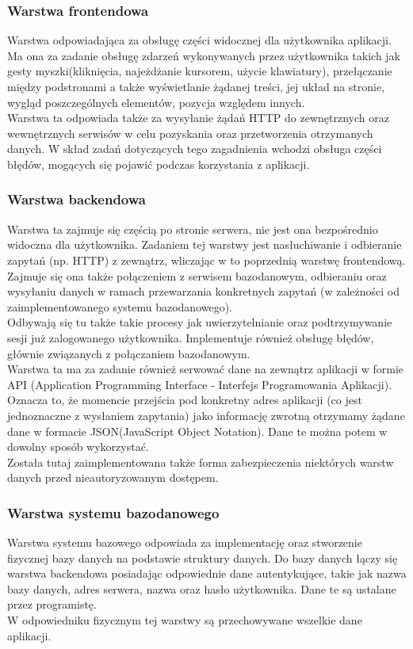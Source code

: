 \documentclass[eng,printmode]{mgr}
\begin{document}
\subsubsection{Warstwa frontendowa}
Warstwa odpowiadająca za obsługę części widocznej dla użytkownika aplikacji. Ma ona za zadanie obsługę zdarzeń wykonywanych przez użytkownika takich jak gesty myszki(kliknięcia, najeżdżanie kursorem, użycie klawiatury), przełączanie między podstronami a także wyświetlanie żądanej treści, jej układ na stronie, wygląd poszczególnych elementów, pozycja względem innych.
\\
Warstwa ta odpowiada także za wysyłanie żądań HTTP do zewnętrznych oraz wewnętrznych serwisów w celu pozyskania oraz przetworzenia otrzymanych danych. W skład zadań dotyczących tego zagadnienia wchodzi obsługa części błędów, mogących się pojawić podczas korzystania z aplikacji.
\subsubsection{Warstwa backendowa}
Warstwa ta zajmuje się częścią po stronie serwera, nie jest ona bezpośrednio widoczna dla użytkownika. Zadaniem tej warstwy jest nasłuchiwanie i odbieranie zapytań (np. HTTP) z zewnątrz, wliczając w to poprzednią warstwę frontendową. Zajmuje się ona także połączeniem z serwisem bazodanowym, odbieraniu oraz wysyłaniu danych w ramach przewarzania konkretnych zapytań (w zależności od zaimplementowanego systemu bazodanowego).
\\
Odbywają się tu także takie procesy jak uwierzytelnianie oraz podtrzymywanie sesji już zalogowanego użytkownika. Implementuje również obsługę błędów, głównie związanych z połączaniem bazodanowym.
\\
Warstwa ta ma za zadanie również serwować dane na zewnątrz aplikacji w formie API (Application Programming Interface - Interfejs Programowania Aplikacji)\cite{API}. Oznacza to, że momencie przejścia pod konkretny adres aplikacji (co jest jednoznaczne z wysłaniem zapytania) jako informację zwrotną otrzymamy żądane dane w formacie JSON(JavaScript Object Notation)\cite{JSON}. Dane te można potem w dowolny sposób wykorzystać.
\\
Została tutaj zaimplementowana także forma zabezpieczenia niektórych warstw danych przed nieautoryzowanym dostępem.
\subsubsection{Warstwa systemu bazodanowego}
Warstwa systemu bazowego odpowiada za implementację oraz stworzenie fizycznej bazy danych na podstawie struktury danych. Do bazy danych łączy się warstwa backendowa posiadając odpowiednie dane autentykujące, takie jak nazwa bazy danych, adres serwera, nazwa oraz hasło użytkownika. Dane te są ustalane przez programistę.
\\
W odpowiedniku fizycznym tej warstwy są przechowywane wszelkie dane aplikacji.
\end{document}
